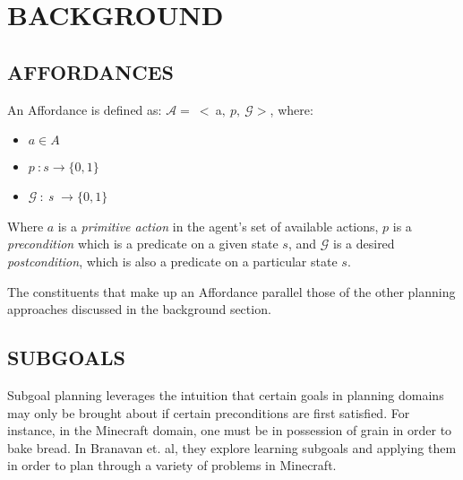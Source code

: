 \documentclass[]{article}
\begin{document}
\section{BACKGROUND}

\subsection{AFFORDANCES}


An Affordance is defined as: $\mathcal{A} =\ <\ $a$ ,\ p,\ \mathcal{G}>$, where:

\begin{itemize}
\item[] $a \in A$
\item[] $p\ : s \rightarrow \{0,1\}$
\item[] $ \mathcal{G}\ :\ ${\it s }$ \rightarrow \{$0$,1\}$
\end{itemize}

Where $a$ is a {\it primitive action} in the agent's set of available actions, $p$ is a {\it precondition} which is a predicate on a given state $s$, and $\mathcal{G}$ is a desired {\it postcondition}, which is also a predicate on a particular state $s$.

The constituents that make up an Affordance parallel those of the other planning approaches discussed in the background section.

\subsection{SUBGOALS}
Subgoal planning leverages the intuition that certain goals in planning domains may only be brought about if certain preconditions are first satisfied. For instance, in the Minecraft domain, one must be in possession of grain in order to bake bread. In Branavan et. al, they explore learning subgoals and applying them in order to plan through a variety of problems in Minecraft.
\end{document}
